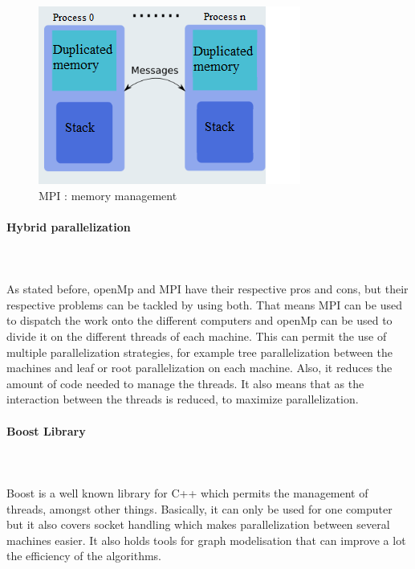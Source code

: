 \begin{figure}[!h] 
\centerline{\includegraphics[scale=0.85]{3_Software_considered/MultithreadingMP_boost_Visual_MPI_5000_Zotero_Project_Baptiste/MPI}}
   \caption{\label{étiquette} MPI : memory management}
\label{fig:MPI}
\end{figure}

\paragraph{Hybrid parallelization}\mbox{}\\\mbox{}\\
As stated before, openMp and MPI have their respective pros and cons, but their respective problems can be tackled by using both. That means MPI can be used to dispatch the work onto the different computers and openMp can be used to divide it on the different threads of each machine. This can permit the use of multiple parallelization strategies, for example tree parallelization between the machines and leaf or root parallelization on each machine. Also, it reduces the amount of code needed to manage the threads. It also means that as the interaction between the threads is reduced, to maximize parallelization.

\paragraph{Boost Library}\mbox{}\\\mbox{}\\
Boost is a well known library for C++ which permits the management of threads, amongst other things. Basically, it can only be used for one computer but it also covers socket handling which makes parallelization between several machines easier. It also holds tools for graph modelisation that can improve a lot the efficiency of the algorithms.

